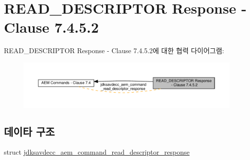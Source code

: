 \hypertarget{group__command__read__descriptor__response}{}\section{R\+E\+A\+D\+\_\+\+D\+E\+S\+C\+R\+I\+P\+T\+OR Response -\/ Clause 7.4.5.2}
\label{group__command__read__descriptor__response}
R\+E\+A\+D\+\_\+\+D\+E\+S\+C\+R\+I\+P\+T\+OR Response -\/ Clause 7.4.5.2에 대한 협력 다이어그램\+:
\nopagebreak
\begin{figure}[H]
\begin{center}
\leavevmode
\includegraphics[width=350pt]{group__command__read__descriptor__response}
\end{center}
\end{figure}
\subsection*{데이타 구조}
\begin{DoxyCompactItemize}
\item 
struct \hyperlink{structjdksavdecc__aem__command__read__descriptor__response}{jdksavdecc\+\_\+aem\+\_\+command\+\_\+read\+\_\+descriptor\+\_\+response}
\end{DoxyCompactItemize}
